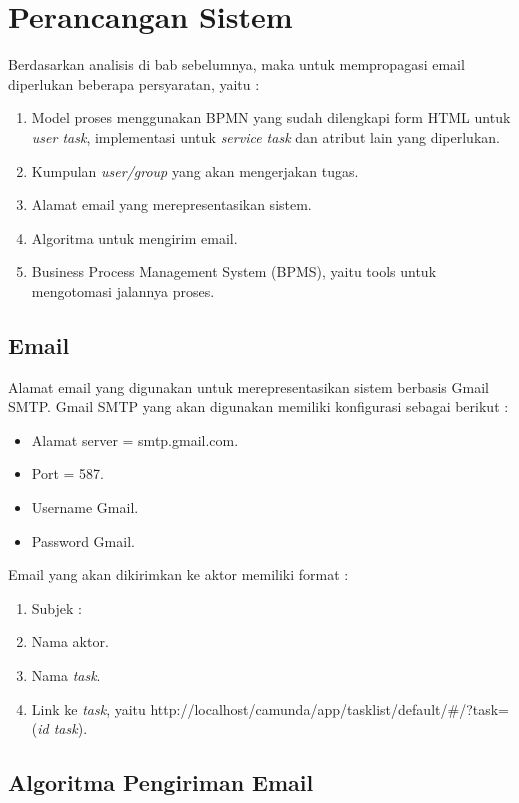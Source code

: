 \section{Perancangan Sistem}
\label{rancangansistem}
Berdasarkan analisis di bab sebelumnya, maka untuk mempropagasi email diperlukan beberapa persyaratan, yaitu :
\begin{enumerate}
	\item Model proses menggunakan BPMN yang sudah dilengkapi form HTML untuk \textit{user task}, implementasi untuk \textit{service task} dan atribut lain yang diperlukan.
	\item Kumpulan \textit{user/group} yang akan mengerjakan tugas.
	\item Alamat email yang merepresentasikan sistem.
	\item Algoritma untuk mengirim email.
	\item Business Process Management System (BPMS), yaitu tools untuk mengotomasi jalannya proses.
\end{enumerate}

\subsection{Email}
\label{email}
Alamat email yang digunakan untuk merepresentasikan sistem berbasis Gmail SMTP. Gmail SMTP yang akan digunakan memiliki konfigurasi sebagai berikut \cite{smtpgoogle} :
\begin{itemize}
	\item Alamat server = smtp.gmail.com.
	\item Port = 587.
	\item Username Gmail.
	\item Password Gmail.
\end{itemize}
Email yang akan dikirimkan ke aktor memiliki format :
\begin{enumerate}
	\item Subjek :
	\item Nama aktor.
	\item Nama \textit{task}.
	\item Link ke \textit{task}, yaitu http://localhost/camunda/app/tasklist/default/\#/?task=(\textit{id task}).
\end{enumerate} 

\subsection{Algoritma Pengiriman Email}
\label{sec:algoritma}

